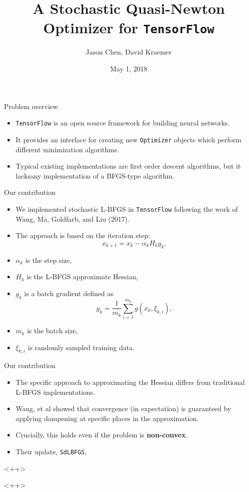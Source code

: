 \documentclass[draft]{beamer}
\title{A Stochastic Quasi-Newton Optimizer for \texttt{TensorFlow}}
\author[Chen, Kraemer]{%
Jason Chen\inst{1}, %
David Kraemer\inst{1}}
\institute[Stony Brook University]
{
  \inst{1}%
  CSE 592: Convex Optimization \\
  Stony Brook University
}
\date[2018]{May 1, 2018}
\begin{document}
\maketitle

\begin{frame}[t]{Problem overview}
  \begin{itemize}
    \item \texttt{TensorFlow} is an open source framework for building neural
      networks.
    \item It provides an interface for creating new \texttt{Optimizer}
      objects which perform different minimization algorithms.
    \item Typical existing implementations are first order descent
      algorithms, but it lacks\footnotemark any implementation of a BFGS-type
      algorithm.
  \end{itemize}
\end{frame}

\begin{frame}[t]{Our contribution}
  \begin{itemize}
    \item We implemented stochastic L-BFGS in \texttt{TensorFlow} following the
      work of Wang, Ma, Goldfarb, and Liu (2017).
    \item The approach is based on the iteration step:
      \[
        x_{k+1} = x_k - \alpha_k H_k g_k,
      \]
    \item $\alpha_k$ is the step size,
    \item $H_k$ is the L-BFGS approximate Hessian,
    \item $g_k$ is a batch gradient defined as
      \begin{equation*}
        g_k = \frac{1}{m_k} \sum_{i=1}^{m_k} g(x_k, \xi_{k,i}),
      \end{equation*}
    \item $m_k$ is the batch size,
    \item $\xi_{k,i}$ is randomly sampled training data.
  \end{itemize}
\end{frame}

\begin{frame}[t]{Our contribution}
  \begin{itemize}
    \item The specific approach to approximating the Hessian differs from
      traditional L-BFGS implementations.
    \item Wang, et al showed that convergence (in expectation) is guaranteed by
      applying dampening at specific places in the approximation.
    \item Crucially, this holds even if the problem is \textbf{non-convex}.
    \item Their update, \texttt{SdLBFGS}, 
  \end{itemize}<++>
  
\end{frame}<++>
\end{document}
